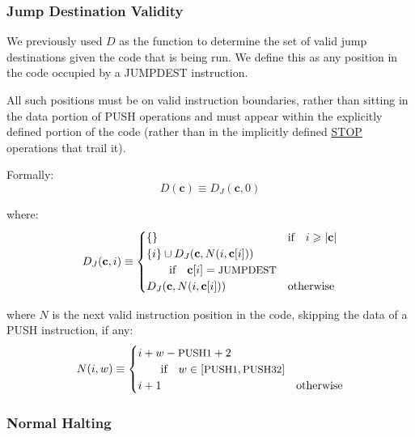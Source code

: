 \documentclass[9pt,oneside]{amsart}
\makeatletter
\newcommand{\linkdest}[1]{\Hy@raisedlink{\hypertarget{#1}{}}}
\makeatother
\begin{document}
\begin{multicols}{2}
\subsubsection{Jump Destination Validity}

We previously used $D$ as the function to determine the set of valid jump destinations given the code that is being run. We define this as any position in the code occupied by a {\small JUMPDEST} instruction.

All such positions must be on valid instruction boundaries, rather than sitting in the data portion of {\small PUSH} operations and must appear within the explicitly defined portion of the code (rather than in the implicitly defined \hyperlink{stop}{{\small STOP}} operations that trail it).

Formally:
\begin{equation}
D(\mathbf{c}) \equiv D_{J}(\mathbf{c}, 0)
\end{equation}

where:
\begin{equation}
D_{J}(\mathbf{c}, i) \equiv \begin{cases}
\{\} & \text{if} \quad i \geqslant |\mathbf{c}|  \\
\{ i \} \cup D_{J}(\mathbf{c}, N(i, \mathbf{c}[i])) & \\
\quad\quad\text{if} \quad \mathbf{c}[i] = \text{\small JUMPDEST} \\
D_{J}(\mathbf{c}, N(i, \mathbf{c}[i])) & \text{otherwise} \\
\end{cases}
\end{equation}

where $N$ is the next valid instruction position in the code, skipping the data of a {\small PUSH} instruction, if any:
\begin{equation}
N(i, w) \equiv \begin{cases}
i + w - \text{\small PUSH1} + 2 & \\
\quad\quad\text{if} \quad w \in [\text{\small PUSH1}, \text{\small PUSH32}] \\
i + 1 & \text{otherwise} \end{cases}
\end{equation}

\subsubsection{Normal Halting}\hypertarget{normal_halting_function_H}{}\linkdest{hhalt}


\end{multicols}
\end{document}

